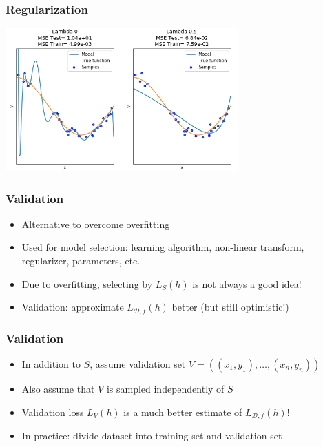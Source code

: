 \documentclass[10pt]{beamer}
\begin{document}
\begin{frame}
  \frametitle{Regularization}
  \begin{center}
  \includegraphics[height=5.5cm]{images/reg.png}
  \end{center}
\end{frame}

\begin{frame}
  \frametitle{Validation}
  \begin{itemize}
	\item Alternative to overcome overfitting
	\item Used for {\color{red} model selection}: learning algorithm, non-linear transform, regularizer, parameters, etc.
	\item Due to overfitting, selecting by $L_S(h)$ is not always a good idea!
	\item {\color{blue} Validation}: approximate $L_{\mathcal{D},f}(h)$ better (but still optimistic!)
  \end{itemize}
\end{frame}

\begin{frame}
  \frametitle{Validation}
  \begin{itemize}
	\item In addition to $S$, assume {\color{red} validation set} $V=((x_1,y_1),\ldots,(x_n,y_n))$
	\item Also assume that $V$ is sampled independently of $S$
	\item {\color{blue} Validation loss} $L_V(h)$ is a much better estimate of $L_{\mathcal{D},f}(h)$!
	\item {\color{green} In practice}: divide dataset into training set and validation set
  \end{itemize}
\end{frame}
\end{document}

